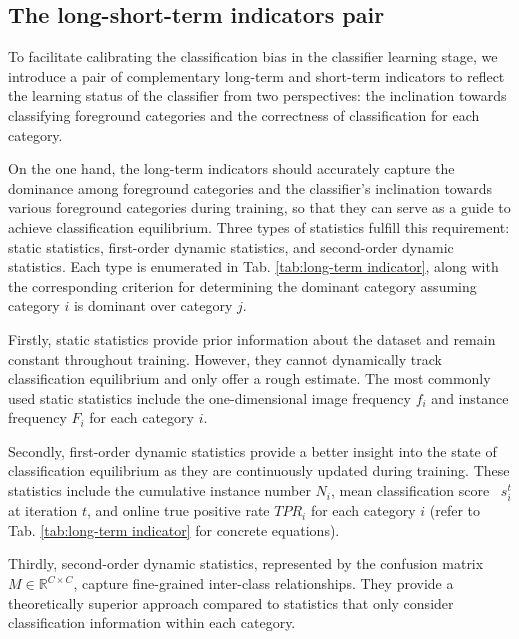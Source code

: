 \documentclass[lettersize,journal]{IEEEtran}
\begin{document}
\subsection{The long-short-term indicators pair}\label{sec:3.3}

To facilitate calibrating the classification bias in the classifier learning stage, we introduce a pair of complementary long-term and short-term indicators to reflect the learning status of the classifier from two perspectives: the inclination towards classifying foreground categories and the correctness of classification for each category.


On the one hand, the long-term indicators should accurately capture the dominance among foreground categories and the classifier's inclination towards various foreground categories during training, so that they can serve as a guide to achieve classification equilibrium.
Three types of statistics fulfill this requirement: static statistics, first-order dynamic statistics, and second-order dynamic statistics.
Each type is enumerated in Tab. \ref{tab:long-term indicator}, along with the corresponding criterion for determining the dominant category assuming category $i$ is dominant over category $j$.

Firstly, static statistics provide prior information about the dataset and remain constant throughout training.
However, they cannot dynamically track classification equilibrium and only offer a rough estimate.
The most commonly used static statistics include the one-dimensional image frequency $f_i$ and instance frequency $F_i$ for each category $i$.

Secondly, first-order dynamic statistics provide a better insight into the state of classification equilibrium as they are continuously updated during training.
These statistics include the cumulative instance number $N_i$, mean classification score~\cite{feng2021exploring} $s_i^t$ at iteration $t$, and online true positive rate $T\!P\!R_i$ for each category $i$
(refer to Tab. \ref{tab:long-term indicator} for concrete equations).

Thirdly, second-order dynamic statistics, represented by the confusion matrix~\cite{he2022relieving} $M\in\mathbb{R}^{C\times C}$, capture fine-grained inter-class relationships.
They provide a theoretically superior approach compared to statistics that only consider classification information within each category.
\end{document}
